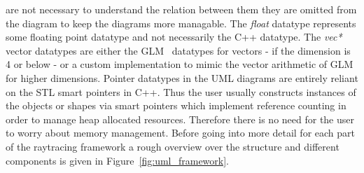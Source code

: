 \documentclass[a4paper,10pt]{article}
\newcommand{\figref}[1]{Figure~\ref{#1}}
\begin{document}
    are not necessary to understand the relation between them
    they are omitted from the diagram to keep the diagrams more
    managable.
    The \emph{float} datatype represents some floating point datatype
    and not necessarily the C++ datatype.
    The \emph{vec*} vector datatypes are either the GLM~\cite{glm} datatypes
    for vectors - if the dimension is 4 or below - or a custom implementation
    to mimic the vector arithmetic of GLM for higher dimensions.
    Pointer datatypes in the UML diagrams are entirely reliant on
    the STL smart pointers in C++.
    Thus the user usually constructs instances of the objects or shapes
    via smart pointers which implement reference counting
    in order to manage heap allocated resources.
    Therefore there is no need for the user to worry about 
    memory management. 
    Before going into more detail for each part of the raytracing
    framework a rough overview over the structure and different
    components is given in \figref{fig:uml_framework}.
    
\end{document}
